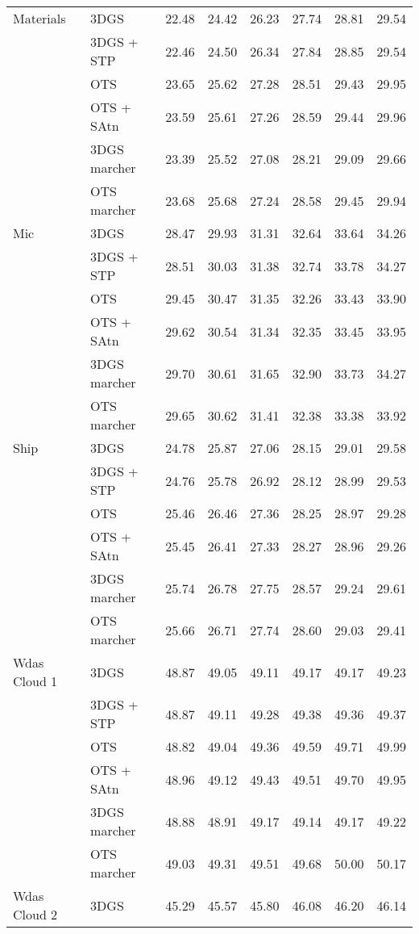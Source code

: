 \begin{longtable}[H]{llrrrrrr}
Materials & 3DGS & 22.48 & 24.42 & 26.23 & 27.74 & 28.81 & 29.54 \\
 & 3DGS + STP & 22.46 & 24.50 & 26.34 & 27.84 & 28.85 & 29.54 \\
 & OTS & 23.65 & 25.62 & 27.28 & 28.51 & 29.43 & 29.95 \\
 & OTS + SAtn & 23.59 & 25.61 & 27.26 & 28.59 & 29.44 & 29.96 \\
 & 3DGS marcher & 23.39 & 25.52 & 27.08 & 28.21 & 29.09 & 29.66 \\
 & OTS marcher & 23.68 & 25.68 & 27.24 & 28.58 & 29.45 & 29.94 \\
Mic & 3DGS & 28.47 & 29.93 & 31.31 & 32.64 & 33.64 & 34.26 \\
 & 3DGS + STP & 28.51 & 30.03 & 31.38 & 32.74 & 33.78 & 34.27 \\
 & OTS & 29.45 & 30.47 & 31.35 & 32.26 & 33.43 & 33.90 \\
 & OTS + SAtn & 29.62 & 30.54 & 31.34 & 32.35 & 33.45 & 33.95 \\
 & 3DGS marcher & 29.70 & 30.61 & 31.65 & 32.90 & 33.73 & 34.27 \\
 & OTS marcher & 29.65 & 30.62 & 31.41 & 32.38 & 33.38 & 33.92 \\
Ship & 3DGS & 24.78 & 25.87 & 27.06 & 28.15 & 29.01 & 29.58 \\
 & 3DGS + STP & 24.76 & 25.78 & 26.92 & 28.12 & 28.99 & 29.53 \\
 & OTS & 25.46 & 26.46 & 27.36 & 28.25 & 28.97 & 29.28 \\
 & OTS + SAtn & 25.45 & 26.41 & 27.33 & 28.27 & 28.96 & 29.26 \\
 & 3DGS marcher & 25.74 & 26.78 & 27.75 & 28.57 & 29.24 & 29.61 \\
 & OTS marcher & 25.66 & 26.71 & 27.74 & 28.60 & 29.03 & 29.41 \\
Wdas Cloud 1 & 3DGS & 48.87 & 49.05 & 49.11 & 49.17 & 49.17 & 49.23 \\
 & 3DGS + STP & 48.87 & 49.11 & 49.28 & 49.38 & 49.36 & 49.37 \\
 & OTS & 48.82 & 49.04 & 49.36 & 49.59 & 49.71 & 49.99 \\
 & OTS + SAtn & 48.96 & 49.12 & 49.43 & 49.51 & 49.70 & 49.95 \\
 & 3DGS marcher & 48.88 & 48.91 & 49.17 & 49.14 & 49.17 & 49.22 \\
 & OTS marcher & 49.03 & 49.31 & 49.51 & 49.68 & 50.00 & 50.17 \\
Wdas Cloud 2 & 3DGS & 45.29 & 45.57 & 45.80 & 46.08 & 46.20 & 46.14 \\

\end{longtable}
